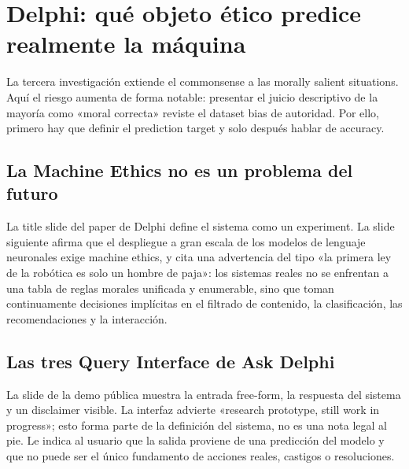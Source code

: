 \section{Delphi: qué objeto ético predice realmente la máquina}

La tercera investigación extiende el commonsense a las morally salient situations. Aquí el riesgo aumenta de forma notable: presentar el juicio descriptivo de la mayoría como «moral correcta» reviste el dataset bias de autoridad. Por ello, primero hay que definir el prediction target y solo después hablar de accuracy.

\subsection{La Machine Ethics no es un problema del futuro}

La title slide del paper de Delphi define el sistema como un experiment. La slide siguiente afirma que el despliegue a gran escala de los modelos de lenguaje neuronales exige machine ethics, y cita una advertencia del tipo «la primera ley de la robótica es solo un hombre de paja»: los sistemas reales no se enfrentan a una tabla de reglas morales unificada y enumerable, sino que toman continuamente decisiones implícitas en el filtrado de contenido, la clasificación, las recomendaciones y la interacción.




\subsection{Las tres Query Interface de Ask Delphi}

La slide de la demo pública muestra la entrada free-form, la respuesta del sistema y un disclaimer visible. La interfaz advierte «research prototype, still work in progress»; esto forma parte de la definición del sistema, no es una nota legal al pie. Le indica al usuario que la salida proviene de una predicción del modelo y que no puede ser el único fundamento de acciones reales, castigos o resoluciones.

